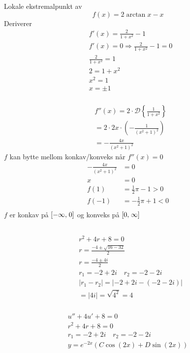 \documentclass[defaultpackages]{cheatsheet}
\begin{document}
	\subsubsection{}
	Lokale ekstremalpunkt av 
	\[f(x) = 2\arctan x - x\]
	Deriverer
	\begin{align*}
		&f'(x) = \frac{2}{1+x^2} - 1\\
		&f'(x) = 0 \Rightarrow \frac{2}{1+x^2} - 1 = 0\\
		&\frac{2}{1+x^2} = 1\\
		&2 = 1+x^2\\
		&x^2=1\\
		&x=\pm 1
	\end{align*}
	\subsubsection{}
	\begin{align*}
		&f''(x) = 2\cdot \mathcal D \left\{\frac{1}{1+x^2}\right\}\\
		& = 2\cdot 2x \cdot \left(-\frac{1}{(x^2+1)^2}\right)\\
		& = -\frac{4x}{(x^2+1)^2} 
	\end{align*}
	$f$ kan bytte mellom konkav/konveks når $f''(x)=0$
	\begin{align*}
		-\frac{4x}{(x^2+1)^2} &= 0\\
		x &= 0\\
		f(1) &= \frac{1}{2}\pi - 1 > 0\\
		f(-1) &= -\frac{1}{2}\pi + 1 < 0\\ 
	\end{align*}
	$f$ er konkav på $\interval[{-\infty,\;0}]$ og konveks på $\interval[{0,\;\infty}]$
	\subsection{}
	\subsubsection{}
	\begin{align*}
		&r^2+4r+8=0\\
		&r = \frac{-4 \pm \sqrt{16 - 32}}{2}\\
		&r = \frac{-4 \pm 4i}{2}\\
		&r_1 = -2 + 2i\quad r_2 = -2 - 2i\\
		& |r_1-r_2| = |-2+2i-(-2-2i)|\\
		& = |4i| = \sqrt{4^2} = 4
	\end{align*}
	\subsubsection{}
	\begin{gather*}
		u'' + 4u' + 8 = 0\\
	  r^2+4r+8=0\\
	  r_1 = -2 + 2i\quad r_2 = -2 - 2i\\
	  y = e^{-2x}(C\cos(2x)+D\sin(2x))
	\end{gather*}
\end{document}
